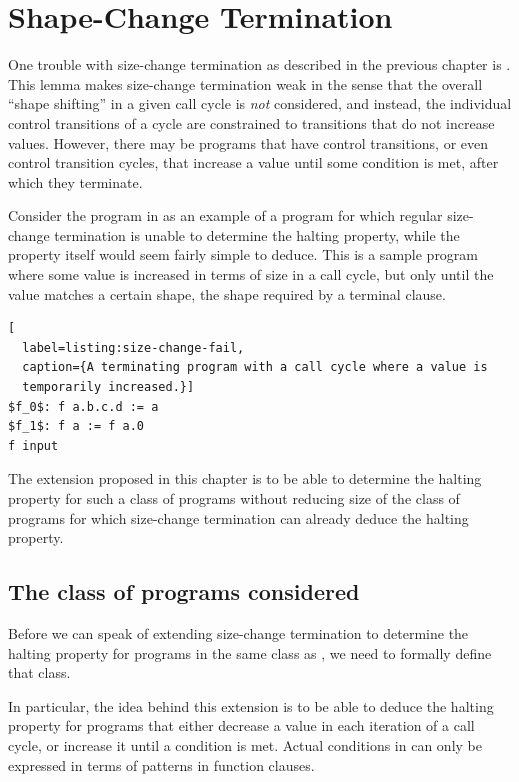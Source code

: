 \chapter{Shape-Change Termination}

One trouble with size-change termination as described in the previous chapter
is . This lemma makes size-change termination weak
in the sense that the overall ``shape shifting'' in a given call cycle is
\emph{not} considered, and instead, the individual control transitions of a
cycle are constrained to transitions that do not increase values. However,
there may be programs that have control transitions, or even control transition
cycles, that increase a value until some condition is met, after which they
terminate.

Consider the program in  as an example of a
program for which regular size-change termination is unable to determine the
halting property, while the property itself would seem fairly simple to deduce.
This is a sample program where some value is increased in terms of size in a
call cycle, but only until the value matches a certain shape, the shape
required by a terminal clause.

\begin{lstlisting}[
  label=listing:size-change-fail,
  caption={A terminating program with a call cycle where a value is
  temporarily increased.}]
$f_0$: f a.b.c.d := a
$f_1$: f a := f a.0
f input
\end{lstlisting}

The extension proposed in this chapter is to be able to determine the halting
property for such a class of programs without reducing size of the class of
programs for which size-change termination can already deduce the halting
property.

\section{The class of programs considered}

Before we can speak of extending size-change termination to determine the
halting property for programs in the same class as
, we need to formally define that class.

In particular, the idea behind this extension is to be able to deduce the
halting property for programs that either decrease a value in each iteration of
a call cycle, or increase it until a condition is met. Actual conditions in
\D{} can only be expressed in terms of patterns in function clauses.

